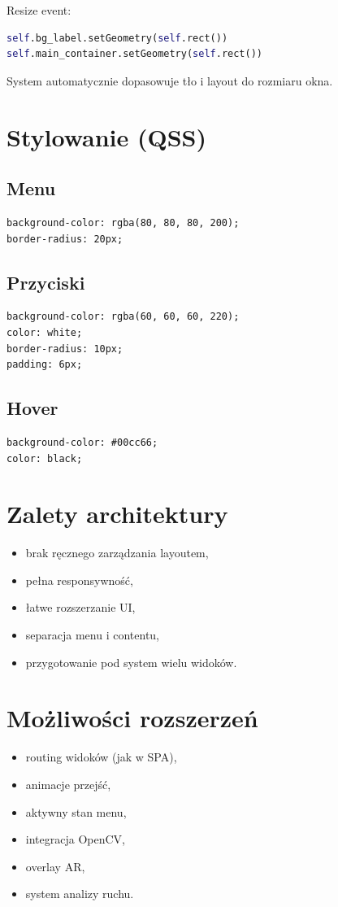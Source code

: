 \documentclass[11pt]{article}
\begin{document}
Resize event:

\begin{lstlisting}[language=Python]
self.bg_label.setGeometry(self.rect())
self.main_container.setGeometry(self.rect())
\end{lstlisting}

System automatycznie dopasowuje tło i layout do rozmiaru okna.

\section{Stylowanie (QSS)}

\subsection{Menu}

\begin{lstlisting}
background-color: rgba(80, 80, 80, 200);
border-radius: 20px;
\end{lstlisting}

\subsection{Przyciski}

\begin{lstlisting}
background-color: rgba(60, 60, 60, 220);
color: white;
border-radius: 10px;
padding: 6px;
\end{lstlisting}

\subsection{Hover}

\begin{lstlisting}
background-color: #00cc66;
color: black;
\end{lstlisting}

\section{Zalety architektury}

\begin{itemize}
    \item brak ręcznego zarządzania layoutem,
    \item pełna responsywność,
    \item łatwe rozszerzanie UI,
    \item separacja menu i contentu,
    \item przygotowanie pod system wielu widoków.
\end{itemize}

\section{Możliwości rozszerzeń}

\begin{itemize}
    \item routing widoków (jak w SPA),
    \item animacje przejść,
    \item aktywny stan menu,
    \item integracja OpenCV,
    \item overlay AR,
    \item system analizy ruchu.
\end{itemize}
\end{document}
